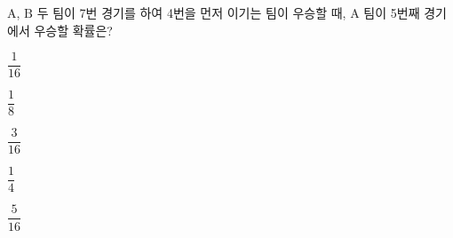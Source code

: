 $\mathrm{A}$, $\mathrm{B}$ 두 팀이 7번 경기를 하여 4번을 먼저 이기는 팀이 우승할 때, $\mathrm{A}$ 팀이 5번째 경기에서 우승할 확률은? 
\begin{choicesii}{\rule[-3ex]{0pt}{8ex}$\dfrac{1}{16}$}{\rule[-3ex]{0pt}{8ex}$\dfrac{1}{8}$}{\rule[-3ex]{0pt}{8ex}$\dfrac{3}{16}$}{\rule[-3ex]{0pt}{8ex}$\dfrac{1}{4}$}{\rule[-3ex]{0pt}{8ex}$\dfrac{5}{16}$}\end{choicesii}
